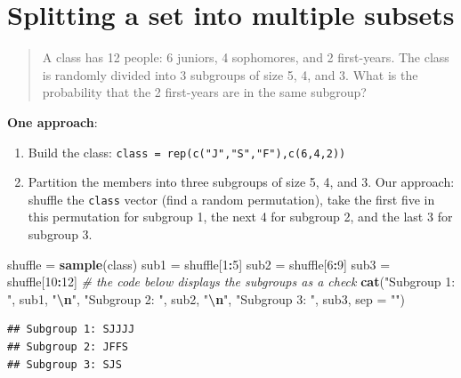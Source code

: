 \documentclass[
]{book}
\newenvironment{Shaded}{\begin{snugshade}}{\end{snugshade}}
\newcommand{\AttributeTok}[1]{\textcolor[rgb]{0.13,0.29,0.53}{#1}}
\newcommand{\CommentTok}[1]{\textcolor[rgb]{0.56,0.35,0.01}{\textit{#1}}}
\newcommand{\DecValTok}[1]{\textcolor[rgb]{0.00,0.00,0.81}{#1}}
\newcommand{\FunctionTok}[1]{\textcolor[rgb]{0.13,0.29,0.53}{\textbf{#1}}}
\newcommand{\NormalTok}[1]{#1}
\newcommand{\OtherTok}[1]{\textcolor[rgb]{0.56,0.35,0.01}{#1}}
\newcommand{\SpecialCharTok}[1]{\textcolor[rgb]{0.81,0.36,0.00}{\textbf{#1}}}
\newcommand{\StringTok}[1]{\textcolor[rgb]{0.31,0.60,0.02}{#1}}
\theoremstyle{definition}
\theoremstyle{definition}
\theoremstyle{definition}
\theoremstyle{definition}
\theoremstyle{remark}
\begin{document}
\section{Splitting a set into multiple subsets}\label{partition-set-R}

\begin{quote}
A class has 12 people: 6 juniors, 4 sophomores, and 2 first-years. The class is randomly divided into 3 subgroups of size 5, 4, and 3. What is the probability that the 2 first-years are in the same subgroup?
\end{quote}

\textbf{One approach}:

\begin{enumerate}
\def\labelenumi{\arabic{enumi}.}
\item
  Build the class: \texttt{class\ =\ rep(c("J","S","F"),c(6,4,2))}
\item
  Partition the members into three subgroups of size 5, 4, and 3. Our approach: shuffle the \texttt{class} vector (find a random permutation), take the first five in this permutation for subgroup 1, the next 4 for subgroup 2, and the last 3 for subgroup 3.
\end{enumerate}

\begin{Shaded}
\begin{Highlighting}[]
\NormalTok{shuffle }\OtherTok{=} \FunctionTok{sample}\NormalTok{(class)}
\NormalTok{sub1 }\OtherTok{=}\NormalTok{ shuffle[}\DecValTok{1}\SpecialCharTok{:}\DecValTok{5}\NormalTok{]}
\NormalTok{sub2 }\OtherTok{=}\NormalTok{ shuffle[}\DecValTok{6}\SpecialCharTok{:}\DecValTok{9}\NormalTok{]}
\NormalTok{sub3 }\OtherTok{=}\NormalTok{ shuffle[}\DecValTok{10}\SpecialCharTok{:}\DecValTok{12}\NormalTok{]}
\CommentTok{\# the code below displays the subgroups as a check}
\FunctionTok{cat}\NormalTok{(}\StringTok{"Subgroup 1: "}\NormalTok{, sub1, }\StringTok{"}\SpecialCharTok{\textbackslash{}n}\StringTok{"}\NormalTok{,}
    \StringTok{"Subgroup 2: "}\NormalTok{, sub2, }\StringTok{"}\SpecialCharTok{\textbackslash{}n}\StringTok{"}\NormalTok{,}
    \StringTok{"Subgroup 3: "}\NormalTok{, sub3, }\AttributeTok{sep =} \StringTok{""}\NormalTok{)}
\end{Highlighting}
\end{Shaded}

\begin{verbatim}
## Subgroup 1: SJJJJ
## Subgroup 2: JFFS
## Subgroup 3: SJS
\end{verbatim}
\end{document}

